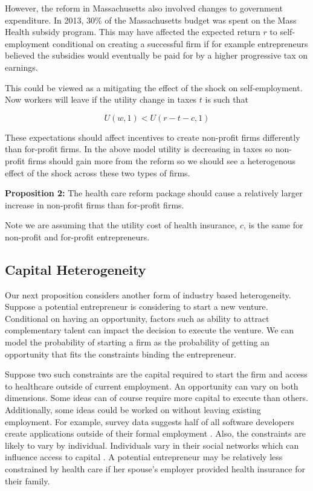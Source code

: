 \documentclass[12pt]{article}
\begin{document}
However, the reform in Massachusetts also involved changes to government expenditure. In 2013, 30\% of the Massachusetts budget was spent on the Mass Health \cite{masshealth} subsidy program. This may have affected the expected return $r$ to self-employment conditional on creating a successful firm if for example entrepreneurs believed the subsidies would eventually be paid for by a higher progressive tax on earnings.

This could be viewed as a mitigating the effect of the shock on self-employment. Now workers will leave if the utility change in taxes $t$ is such that

$$U(w,1) < U(r-t-c,1)$$

These expectations should affect incentives to create non-profit firms differently than for-profit firms. In the above model utility is decreasing in taxes so non-profit firms should gain more from the reform so we should see a heterogenous effect of the shock across these two types of firms.  

\textbf{Proposition 2:} 
The health care reform package should cause a relatively larger increase in non-profit firms than for-profit firms. 

Note we are assuming that the utility cost of health insurance, $c$, is the same for non-profit and for-profit entrepreneurs.  

\subsection{Capital Heterogeneity}

Our next proposition considers another form of industry based heterogeneity. Suppose a potential entrepreneur is considering to start a new venture. Conditional on having an opportunity, factors such as ability to attract complementary talent \cite{stuartSorensen} can impact the decision to execute the venture. We can model the probability of starting a firm as the probability of getting an opportunity that fits the constraints binding the entrepreneur. 

Suppose two such constraints are the capital required to start the firm and access to healthcare  outside of current employment. An opportunity can vary on both dimensions. Some ideas can of course require more capital to execute than others. Additionally, some ideas could be worked on without leaving existing employment. For example, survey data suggests half of all software developers create applications outside of their formal employment \cite{evans}. Also, the constraints are likely to vary by individual. Individuals vary in their social networks which can influence access to capital \cite{uzzi}. A potential entrepreneur may be relatively less constrained by health care if her spouse's employer provided health insurance for their family. 
\end{document}
